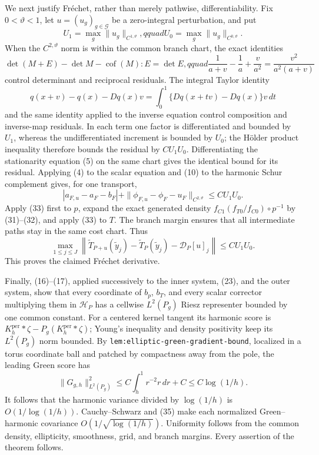 We next justify Fr\'echet, rather than merely pathwise, differentiability.  Fix \(0<\vartheta<1\), let \(u=(u_g)_{g\in\mathcal G}\) be a zero-integral perturbation, and put
\[
 U_1=\max_g\|u_g\|_{C^{1,\vartheta}},qquad
 U_0=\max_g\|u_g\|_{C^{0,\vartheta}}.                                \tag{30}
\]
When the \(C^{2,\vartheta}\) norm is within the common branch chart, the exact identities
\[
 \det(M+E)-\det M-\operatorname{cof}(M):E=\det E,qquad
 \frac1{a+v}-\frac1a+\frac v{a^2}=\frac{v^2}{a^2(a+v)}                \tag{31}
\]
control determinant and reciprocal residuals.  The integral Taylor identity
\[
 q(x+v)-q(x)-Dq(x)v
 =\int_0^1\{Dq(x+tv)-Dq(x)\}v\,dt                                    \tag{32}
\]
and the same identity applied to the inverse equation control composition and inverse-map residuals.  In each term one factor is differentiated and bounded by \(U_1\), whereas the undifferentiated increment is bounded by \(U_0\); the H\"older product inequality therefore bounds the residual by \(CU_1U_0\).  Differentiating the stationarity equation (5) on the same chart gives the identical bound for its residual.  Applying (4) to the scalar equation and (10) to the harmonic Schur complement gives, for one transport,
\[
 |a_{F,u}-a_F-b_F|+
 \|\phi_{F,u}-\phi_F-u_F\|_{C^{2,\vartheta}}
 \leq CU_1U_0.                                                        \tag{33}
\]
Apply (33) first to \(p\), expand the exact generated density
\(f_{C1}(f_{T0}/f_{C0})\circ p^{-1}\) by (31)--(32), and apply (33) to \(T\).  The branch margin ensures that all intermediate paths stay in the same cost chart.  Thus
\[
 \max_{1\leq j\leq J}\left\|
 \widetilde T_{P+u}(\widetilde y_j)-\widetilde T_P(\widetilde y_j)
 -\mathcal D_P[u]_j\right\|\leq CU_1U_0.                              \tag{34}
\]
This proves the claimed Fr\'echet derivative.

Finally, (16)--(17), applied successively to the inner system, (23), and the outer system, show that every coordinate of \(b_p\), \(b_T\), and every scalar corrector multiplying them in \(\mathcal H_P\) has a cellwise \(L^2(P_g)\) Riesz representer bounded by one common constant.  For a centered kernel tangent its harmonic score is \(K_h^{\mathrm{per}}*\zeta-P_g(K_h^{\mathrm{per}}*\zeta)\); Young's inequality and density positivity keep its \(L^2(P_g)\) norm bounded.  By \texttt{lem:elliptic-green-gradient-bound}, localized in a torus coordinate ball and patched by compactness away from the pole, the leading Green score has
\[
 \|G_{g,h}\|_{L^2(P_g)}^2
 \leq C\int_h^1r^{-2}r\,dr+C\leq C\log(1/h).                          \tag{35}
\]
It follows that the harmonic variance divided by \(\log(1/h)\) is \(O(1/\log(1/h))\).  Cauchy--Schwarz and (35) make each normalized Green--harmonic covariance \(O(1/\sqrt{\log(1/h)})\).  Uniformity follows from the common density, ellipticity, smoothness, grid, and branch margins.  Every assertion of the theorem follows.

